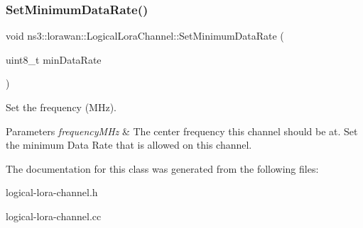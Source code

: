 \subsubsection{\texorpdfstring{Set\+Minimum\+Data\+Rate()}{SetMinimumDataRate()}}
{\footnotesize\ttfamily void ns3\+::lorawan\+::\+Logical\+Lora\+Channel\+::\+Set\+Minimum\+Data\+Rate (\begin{DoxyParamCaption}\item[{uint8\+\_\+t}]{min\+Data\+Rate }\end{DoxyParamCaption})}

Set the frequency (M\+Hz).


\begin{DoxyParams}{Parameters}
{\em frequency\+M\+Hz} & The center frequency this channel should be at. Set the minimum Data Rate that is allowed on this channel. \\
\hline
\end{DoxyParams}


The documentation for this class was generated from the following files\+:\begin{DoxyCompactItemize}
\item 
logical-\/lora-\/channel.\+h\item 
logical-\/lora-\/channel.\+cc\end{DoxyCompactItemize}
